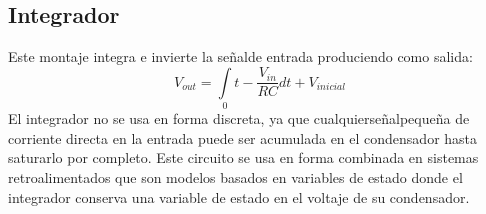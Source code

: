 \documentclass[12pt,spanish,lettersize,twocolumn]{article}
\begin{document}
\subsection{Integrador}
\vspace{3cm}
Este montaje integra e invierte la se\~nalde entrada produciendo como salida:
\begin{equation*}
V_{out}=\int\limits_{0}{t}-\frac{V_{in}}{RC}dt+V_{inicial}
\end{equation*}
El integrador no se usa en forma discreta, ya que cualquierse\~nalpeque\~na de corriente directa en la entrada puede ser acumulada en el condensador hasta saturarlo por completo. Este circuito se usa en forma combinada en sistemas retroalimentados que son modelos basados en variables de estado donde el integrador conserva una variable de estado en el voltaje de su condensador.
\begin{equation*}
\end{equation*}
\begin{equation*}
\end{equation*}
\begin{equation*}
\end{equation*}
\begin{equation*}
\end{equation*}
\begin{equation*}
\end{equation*}
\end{document}
